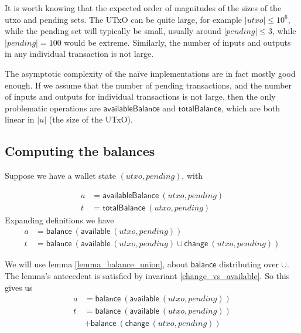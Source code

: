\documentclass{article}
\begin{document}
It is worth knowing that the expected order of magnitudes of the sizes of the
utxo and pending sets. The UTxO can be quite large, for example
$|utxo| \leq 10^6$, while the pending set will typically be small, usually
around $|pending| \leq 3$, while $|pending| = 100$ would be extreme. Similarly,
the number of inputs and outputs in any individual transaction is not large.

The asymptotic complexity of the na\"ive implementations are in fact mostly
good enough. If we assume that the number of pending transactions, and the
number of inputs and outputs for individual transactions is not large,
then the only problematic operations are $\mathsf{availableBalance}$ and
$\mathsf{totalBalance}$, which are both linear in $|u|$ (the size of the UTxO).

\subsection{Computing the balances}

Suppose we have a wallet state $(utxo, pending)$, with

\begin{equation*}
\begin{split}
a & = \mathsf{availableBalance} ~ (utxo, pending) \\
t & = \mathsf{totalBalance} ~ (utxo, pending)
\end{split}
\end{equation*}
Expanding definitions we have
\begin{equation*}
\begin{split}
a & = \mathsf{balance} ~ (\mathsf{available} ~ (utxo, pending)) \\
t & = \mathsf{balance} ~ (\mathsf{available} ~ (utxo, pending) \cup \mathsf{change} ~ (utxo, pending))
\end{split}
\end{equation*}

We will use lemma \ref{lemma_balance_union}, about $\mathsf{balance}$
distributing over $\cup$. The lemma's antecedent is satisfied by invariant
\ref{change_vs_available}. So this gives us
\begin{equation*}
\begin{split}
a & = \mathsf{balance} ~ (\mathsf{available} ~ (utxo, pending)) \\
t & = \mathsf{balance} ~ (\mathsf{available} ~ (utxo, pending)) \\
  & + \mathsf{balance} ~ (\mathsf{change} ~ (utxo, pending))
\end{split}
\end{equation*}
\end{document}
